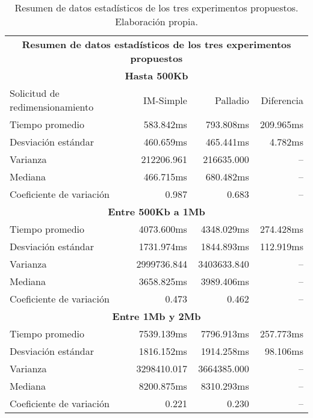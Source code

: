 \hspace{-4cm}
\begin{table}
    \centering
    \begin{tabular}{l|r|r|r}
        \toprule[1.5pt]
        \multicolumn{4}{c}{\textbf{Resumen de datos estadísticos de los tres experimentos propuestos}} \\
        \multicolumn{4}{c}{\textbf{Hasta 500Kb}} \\
        \midrule
        Solicitud de redimensionamiento  & IM-Simple & Palladio & Diferencia\\
        \midrule
        Tiempo promedio  & 583.842ms & 793.808ms & 209.965ms\\
        Desviación estándar & 460.659ms & 465.441ms & 4.782ms\\
        Varianza & 212206.961 & 216635.000 & -- \\
        Mediana & 466.715ms & 680.482ms & -- \\
        Coeficiente de variación & 0.987 & 0.683 & -- \\
        \toprule[1.5pt]
         \multicolumn{4}{c}{\textbf{Entre 500Kb a 1Mb}} \\
         \midrule 
        Tiempo promedio  & 4073.600ms & 4348.029ms & 274.428ms\\
        Desviación estándar & 1731.974ms & 1844.893ms & 112.919ms\\
        Varianza & 2999736.844 & 3403633.840 & --\\
        Mediana & 3658.825ms & 3989.406ms & -- \\
        Coeficiente de variación & 0.473 & 0.462 & -- \\
        \toprule[1.5pt]
         \multicolumn{4}{c}{\textbf{Entre 1Mb y 2Mb}} \\
         \midrule 
        Tiempo promedio  & 7539.139ms & 7796.913ms & 257.773ms\\
        Desviación estándar & 1816.152ms & 1914.258ms & 98.106ms \\
        Varianza & 3298410.017 & 3664385.000 & -- \\
        Mediana & 8200.875ms & 8310.293ms & -- \\
        Coeficiente de variación & 0.221 & 0.230 & -- \\                        
        \bottomrule[1.5pt]
    \end{tabular}
    \caption[Resumen de datos estadísticos de los tres experimentos propuestos]{Resumen de datos estadísticos de los tres experimentos propuestos. Elaboración propia.}
    \label{table:resumen-estadistico-general}
\end{table}




